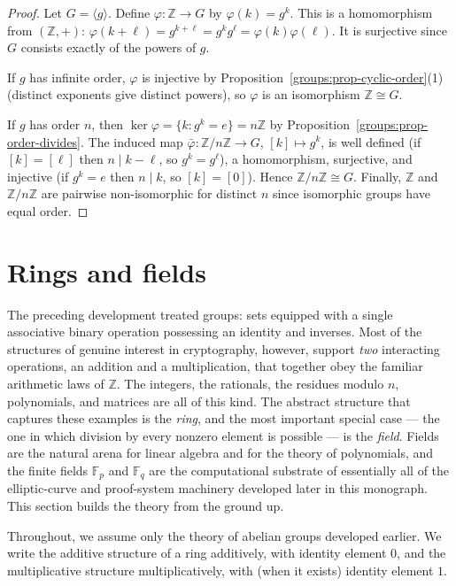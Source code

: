 \documentclass[11pt,a4paper]{article}
\theoremstyle{definition}
\theoremstyle{remark}
\newcommand{\Z}{\ensuremath{\mathbb{Z}}}
\newcommand{\Fp}{\ensuremath{\mathbb{F}_{p}}}
\newcommand{\Fq}{\ensuremath{\mathbb{F}_{q}}}
\begin{document}
\begin{proof}
Let \(G = \langle g\rangle\). Define \(\varphi \colon \Z \to G\) by \(\varphi(k) = g^k\). This is a homomorphism from \((\Z,+)\): \(\varphi(k+\ell) = g^{k+\ell} = g^k g^\ell = \varphi(k)\varphi(\ell)\). It is surjective since \(G\) consists exactly of the powers of \(g\).

If \(g\) has infinite order, \(\varphi\) is injective by Proposition~\ref{groups:prop-cyclic-order}(1) (distinct exponents give distinct powers), so \(\varphi\) is an isomorphism \(\Z \cong G\).

If \(g\) has order \(n\), then \(\ker\varphi = \{k : g^k = e\} = n\Z\) by Proposition~\ref{groups:prop-order-divides}. The induced map \(\bar\varphi \colon \Z/n\Z \to G\), \([k] \mapsto g^k\), is well defined (if \([k]=[\ell]\) then \(n \mid k - \ell\), so \(g^k = g^\ell\)), a homomorphism, surjective, and injective (if \(g^k = e\) then \(n \mid k\), so \([k]=[0]\)). Hence \(\Z/n\Z \cong G\). Finally, \(\Z\) and \(\Z/n\Z\) are pairwise non-isomorphic for distinct \(n\) since isomorphic groups have equal order.
\end{proof}


\section{Rings and fields}\label{sec:ringsfields}

The preceding development treated groups: sets equipped with a single associative binary operation possessing an identity and inverses. Most of the structures of genuine interest in cryptography, however, support \emph{two} interacting operations, an addition and a multiplication, that together obey the familiar arithmetic laws of \(\Z\). The integers, the rationals, the residues modulo \(n\), polynomials, and matrices are all of this kind. The abstract structure that captures these examples is the \emph{ring}, and the most important special case --- the one in which division by every nonzero element is possible --- is the \emph{field}. Fields are the natural arena for linear algebra and for the theory of polynomials, and the finite fields \(\Fp\) and \(\Fq\) are the computational substrate of essentially all of the elliptic-curve and proof-system machinery developed later in this monograph. This section builds the theory from the ground up.

Throughout, we assume only the theory of abelian groups developed earlier. We write the additive structure of a ring additively, with identity element \(0\), and the multiplicative structure multiplicatively, with (when it exists) identity element \(1\).
\end{document}
